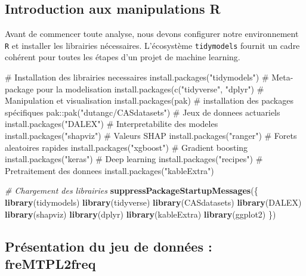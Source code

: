 \documentclass[
  french,
]{book}
\newenvironment{Shaded}{\begin{snugshade}}{\end{snugshade}}
\newcommand{\CommentTok}[1]{\textcolor[rgb]{0.56,0.35,0.01}{\textit{#1}}}
\newcommand{\FunctionTok}[1]{\textcolor[rgb]{0.13,0.29,0.53}{\textbf{#1}}}
\newcommand{\NormalTok}[1]{#1}
\theoremstyle{definition}
\theoremstyle{definition}
\theoremstyle{definition}
\theoremstyle{definition}
\theoremstyle{remark}
\begin{document}
\subsection{Introduction aux manipulations R}

Avant de commencer toute analyse, nous devons configurer notre environnement \texttt{R} et installer les librairies nécessaires. L'écosystème \texttt{tidymodels} \citet{khun2022tidy} fournit un cadre cohérent pour toutes les étapes d'un projet de machine learning.

\begin{Shaded}
\begin{Highlighting}[]
\NormalTok{\# Installation des librairies necessaires}
\NormalTok{install.packages("tidymodels")             \# Meta{-}package pour la modelisation}
\NormalTok{install.packages(c("tidyverse", "dplyr")   \# Manipulation et visualisation}
\NormalTok{install.packages(\textquotesingle{}pak\textquotesingle{})                    \# installation des packages spécifiques}
\NormalTok{pak::pak("dutangc/CASdatasets")            \# Jeux de donnees actuariels}
\NormalTok{install.packages("DALEX")                  \# Interpretabilite des modeles}
\NormalTok{install.packages("shapviz")                \# Valeurs SHAP}
\NormalTok{install.packages("ranger")                 \# Forets aleatoires rapides}
\NormalTok{install.packages("xgboost")                \# Gradient boosting}
\NormalTok{install.packages("keras")                  \# Deep learning}
\NormalTok{install.packages("recipes")                \# Pretraitement des donnees}
\NormalTok{install.packages("kableExtra")}
\end{Highlighting}
\end{Shaded}

\begin{Shaded}
\begin{Highlighting}[]
\CommentTok{\# Chargement des librairies}
\FunctionTok{suppressPackageStartupMessages}\NormalTok{(\{}
\FunctionTok{library}\NormalTok{(tidymodels)}
\FunctionTok{library}\NormalTok{(tidyverse)}
\FunctionTok{library}\NormalTok{(CASdatasets)}
\FunctionTok{library}\NormalTok{(DALEX)}
\FunctionTok{library}\NormalTok{(shapviz)}
\FunctionTok{library}\NormalTok{(dplyr)}
\FunctionTok{library}\NormalTok{(kableExtra)}
\FunctionTok{library}\NormalTok{(ggplot2)}
\NormalTok{\})}
\end{Highlighting}
\end{Shaded}

\subsection{Présentation du jeu de données : freMTPL2freq}
\end{document}

